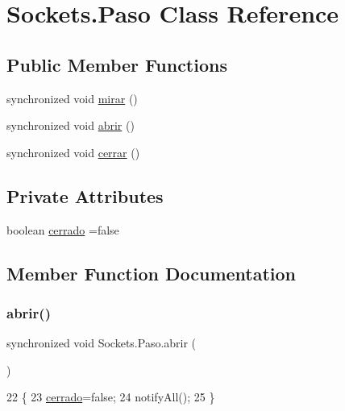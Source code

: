 \hypertarget{class_sockets_1_1_paso}{}\section{Sockets.\+Paso Class Reference}
\label{class_sockets_1_1_paso}
\subsection*{Public Member Functions}
\begin{DoxyCompactItemize}
\item 
synchronized void \mbox{\hyperlink{class_sockets_1_1_paso_a56cd4d4d8e714895b6cc7692223d303c}{mirar}} ()
\item 
synchronized void \mbox{\hyperlink{class_sockets_1_1_paso_ae1faa4c34d81cb9ffaef7ff4bc49eab6}{abrir}} ()
\item 
synchronized void \mbox{\hyperlink{class_sockets_1_1_paso_a56e0e78be832edf53d6cbc29b095ac71}{cerrar}} ()
\end{DoxyCompactItemize}
\subsection*{Private Attributes}
\begin{DoxyCompactItemize}
\item 
boolean \mbox{\hyperlink{class_sockets_1_1_paso_adef5c84c1b38cd3d8d85e20b7aa5babe}{cerrado}} =false
\end{DoxyCompactItemize}


\subsection{Member Function Documentation}
\mbox{\label{class_sockets_1_1_paso_ae1faa4c34d81cb9ffaef7ff4bc49eab6}} 
\subsubsection{\texorpdfstring{abrir()}{abrir()}}
{\footnotesize\ttfamily synchronized void Sockets.\+Paso.\+abrir (\begin{DoxyParamCaption}{ }\end{DoxyParamCaption})\hspace{0.3cm}{\ttfamily [inline]}}


\begin{DoxyCode}
22     \{
23         \mbox{\hyperlink{class_sockets_1_1_paso_adef5c84c1b38cd3d8d85e20b7aa5babe}{cerrado}}=\textcolor{keyword}{false};
24         notifyAll();
25     \}
\end{DoxyCode}
\mbox{\label{class_sockets_1_1_paso_a56e0e78be832edf53d6cbc29b095ac71}} 

